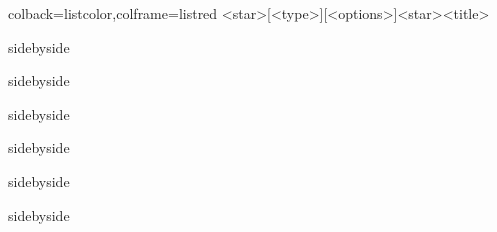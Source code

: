 \documentclass[fontset=none]{ctexart}
\begin{document}
	
	\begin{dispListing*}{colback=listcolor,colframe=listred}
		[<type>][<options>]<star>{<title>}
	\end{dispListing*}
	
	\begin{dispExample*}{sidebyside}
		
	\end{dispExample*}
	
	
	\begin{dispExample*}{sidebyside}
		
	\end{dispExample*}
	
	
	
	\begin{dispExample*}{sidebyside}
		
	\end{dispExample*}
	
	
	
	\begin{dispExample*}{sidebyside}
		
	\end{dispExample*}
	
	
	\begin{dispExample*}{sidebyside}
		
	\end{dispExample*}
	
	
	\begin{dispExample*}{sidebyside}
	\end{dispExample*}
	
	
\end{document}
